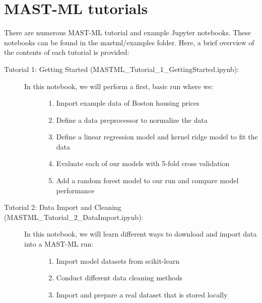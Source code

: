 \documentclass[letterpaper,10pt,english]{sphinxmanual}
\begin{document}
\section{MAST-ML tutorials}
\label{\detokenize{0_5_tutorials:mast-ml-tutorials}}
There are numerous MAST-ML tutorial and example Jupyter notebooks. These notebooks
can be found in the mastml/examples folder. Here, a brief overview of the contents
of each tutorial is provided:
\begin{description}
\item[{Tutorial 1: Getting Started (MASTML\_Tutorial\_1\_GettingStarted.ipynb):}] \leavevmode\begin{description}
\item[{In this notebook, we will perform a first, basic run where we:}] \leavevmode\begin{enumerate}
%
\item {} 
Import example data of Boston housing prices

\item {} 
Define a data preprocessor to normalize the data

\item {} 
Define a linear regression model and kernel ridge model to fit the data

\item {} 
Evaluate each of our models with 5-fold cross validation

\item {} 
Add a random forest model to our run and compare model performance

\end{enumerate}

\end{description}

\item[{Tutorial 2: Data Import and Cleaning (MASTML\_Tutorial\_2\_DataImport.ipynb):}] \leavevmode\begin{description}
\item[{In this notebook, we will learn different ways to download and import data into a MAST-ML run:}] \leavevmode\begin{enumerate}
%
\item {} 
Import model datasets from scikit-learn

\item {} 
Conduct different data cleaning methods

\item {} 
Import and prepare a real dataset that is stored locally


\end{enumerate}
\end{description}
\end{description}
\end{document}
